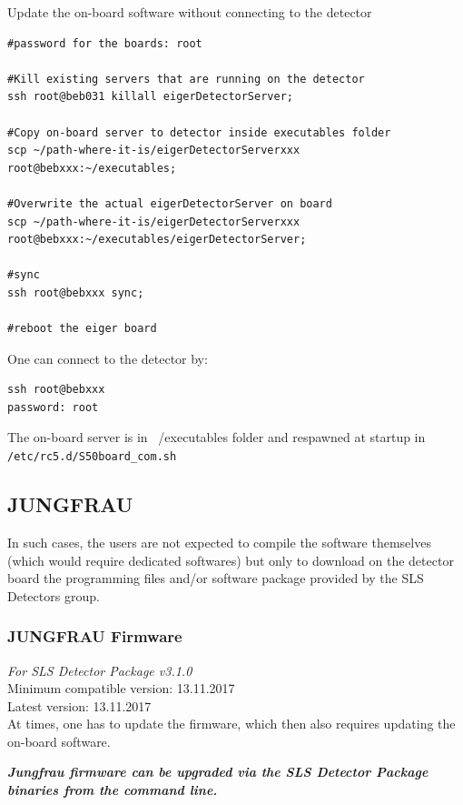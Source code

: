 \documentclass{article}
\begin{document}
Update the on-board software without connecting to the detector
\begin{verbatim}
#password for the boards: root

#Kill existing servers that are running on the detector
ssh root@beb031 killall eigerDetectorServer;

#Copy on-board server to detector inside executables folder
scp ~/path-where-it-is/eigerDetectorServerxxx root@bebxxx:~/executables;

#Overwrite the actual eigerDetectorServer on board
scp ~/path-where-it-is/eigerDetectorServerxxx
root@bebxxx:~/executables/eigerDetectorServer;

#sync
ssh root@bebxxx sync; 

#reboot the eiger board
\end{verbatim}


\bigskip One can connect to the detector by:
\begin{verbatim}
ssh root@bebxxx
password: root
\end{verbatim}


The on-board server is in ~/executables folder and respawned at startup in \\
\verb=/etc/rc5.d/S50board_com.sh= 





\subsection{JUNGFRAU}

In such cases, the users are not expected to compile the software
themselves (which would require dedicated softwares) but only to download on the
detector board the programming files and/or software package provided by
the SLS Detectors group.

\subsubsection{JUNGFRAU Firmware}
\textit{For SLS Detector Package v3.1.0} \\
\indent Minimum compatible version: 13.11.2017 \\
\indent Latest version: 13.11.2017 \\


At times, one has to update the firmware, which then also requires updating the
on-board software. 


\textbf{\textit{Jungfrau firmware can be upgraded via the SLS Detector Package
binaries from the command line.}}
\end{document}
